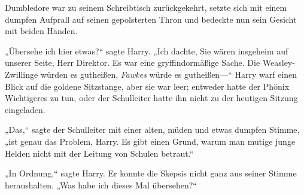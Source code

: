 Dumbledore war zu seinem Schreibtisch zurückgekehrt, setzte sich mit einem dumpfen Aufprall auf seinen gepolsterten Thron und bedeckte nun sein Gesicht mit beiden Händen.

„Übersehe ich hier etwas?“ sagte Harry. „Ich dachte, Sie wären insgeheim auf unserer Seite, Herr Direktor. Es war eine gryffindormäßige Sache. Die Weasley-Zwillinge würden es gutheißen, \emph{Fawkes} würde es gutheißen—“ Harry warf einen Blick auf die goldene Sitzstange, aber sie war leer; entweder hatte der Phönix Wichtigeres zu tun, oder der Schulleiter hatte ihn nicht zu der heutigen Sitzung eingeladen.

„Das,“ sagte der Schulleiter mit einer alten, müden und etwas dumpfen Stimme, „ist genau das Problem, Harry. Es gibt einen Grund, warum man mutige junge Helden nicht mit der Leitung von Schulen betraut.“

„In Ordnung,“ sagte Harry. Er konnte die Skepsis nicht ganz aus seiner Stimme heraushalten. „Was habe ich dieses Mal übersehen?“

